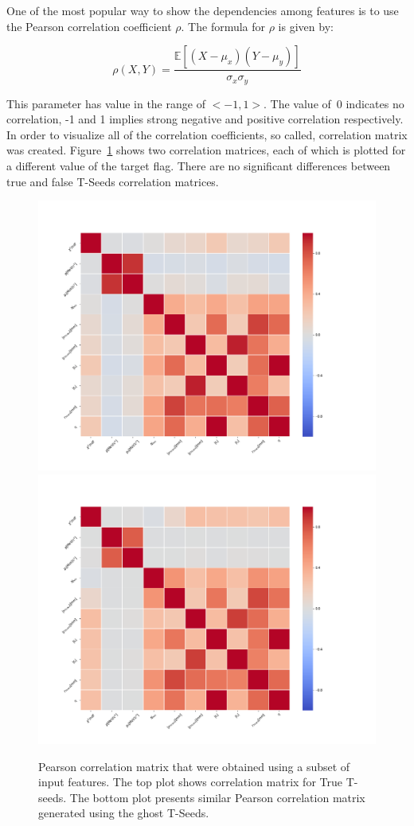 One of the most popular way to show the dependencies among features is to use the Pearson correlation coefficient $\rho$. The formula for $\rho$ is given by:

\begin{equation}
    \rho(X,Y) = \frac{\mathbb{E}\left[(X-\mu_x)(Y-\mu_y)\right]}{\sigma_x \sigma_y}
\end{equation}

This parameter has value in the range of $<-1,1>$. The value of~0 indicates no correlation, -1 and 1 implies strong negative and positive correlation respectively. In order to visualize all of the correlation coefficients, so called, correlation matrix was created. Figure~\ref{fig:corrMatrix} shows two correlation matrices, each of which is plotted for a different value of the target flag. There are no significant differences between true and false T-Seeds correlation matrices. 

\begin{figure}
  \centering
    \includegraphics[width=0.8\linewidth]{figures/corr_matrixTrue.png}\\
    \includegraphics[width=0.8\linewidth]{figures/corr_matrixFalse.png}

  \caption{Pearson  correlation matrix that were obtained using a subset of input features. The top plot shows correlation matrix for True T-seeds. The bottom plot presents similar Pearson correlation matrix generated using the ghost T-Seeds.  
\label{fig:corrMatrix}}  
\end{figure}
    
